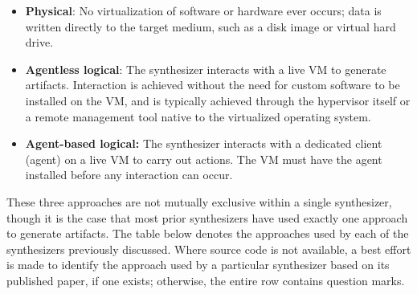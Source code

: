 \documentclass[letterpaper,12pt]{report}
\def\tightlist{}
\begin{document}
\begin{itemize}
\tightlist
\item
  \textbf{Physical}: No virtualization of software or hardware ever
  occurs; data is written directly to the target medium, such as a disk
  image or virtual hard drive.
\item
  \textbf{Agentless logical}: The synthesizer interacts with a live VM
  to generate artifacts. Interaction is achieved without the need for
  custom software to be installed on the VM, and is typically achieved
  through the hypervisor itself or a remote management tool native to
  the virtualized operating system.
\item
  \textbf{Agent-based logical:} The synthesizer interacts with a
  dedicated client (agent) on a live VM to carry out actions. The VM
  must have the agent installed before any interaction can occur.
\end{itemize}

These three approaches are not mutually exclusive within a single
synthesizer, though it is the case that most prior synthesizers have
used exactly one approach to generate artifacts. The table below denotes
the approaches used by each of the synthesizers previously discussed.
Where source code is not available, a best effort is made to identify
the approach used by a particular synthesizer based on its published
paper, if one exists; otherwise, the entire row contains question marks.
\end{document}
